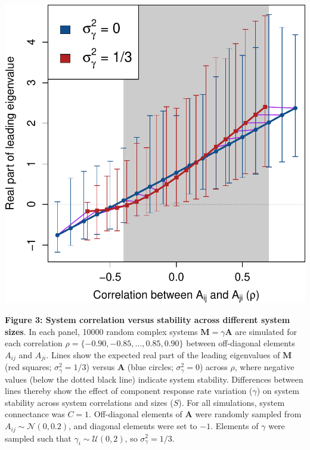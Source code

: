 \documentclass[]{article}
\begin{document}
\includegraphics{ms_files/figure-latex/unnamed-chunk-12-1.pdf}

\clearpage

\textbf{Figure 3: System correlation versus stability across different
system sizes}. In each panel, 10000 random complex systems
\(\mathbf{M} = \gamma \mathbf{A}\) are simulated for each correlation
\(\rho = \{-0.90, -0.85, ..., 0.85, 0.90 \}\) between off-diagonal
elements \(A_{ij}\) and \(A_{ji}\). Lines show the expected real part of
the leading eigenvalues of \(\mathbf{M}\) (red squares;
\(\sigma^{2}_{\gamma} = 1/3\)) versus \(\mathbf{A}\) (blue circles;
\(\sigma^{2}_{\gamma} = 0\)) across \(\rho\), where negative values
(below the dotted black line) indicate system stability. Differences
between lines thereby show the effect of component response rate
variation (\(\gamma\)) on system stability across system correlations
and sizes (\(S\)). For all simulations, system connectance was
\(C = 1\). Off-diagonal elements of \(\textbf{A}\) were randomly sampled
from \(A_{ij} \sim \mathcal{N}(0, 0.2)\), and diagonal elements were set
to \(-1\). Elements of \(\gamma\) were sampled such that
\(\gamma_{i} \sim \mathcal{U}(0, 2)\), so \(\sigma^{2}_{\gamma} = 1/3\).
\end{document}
